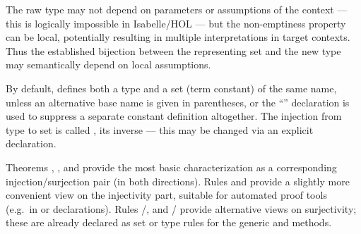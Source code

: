 \begin{isabellebody}
\begin{isamarkuptext}
\begin{description}
  The raw type may not depend on parameters or assumptions of the
  context --- this is logically impossible in Isabelle/HOL --- but the
  non-emptiness property can be local, potentially resulting in
  multiple interpretations in target contexts.  Thus the established
  bijection between the representing set  and the new type
   may semantically depend on local assumptions.

  By default, \hyperlink{command.HOL.typedef}{\mbox{}} defines both a type 
  and a set (term constant) of the same name, unless an alternative
  base name is given in parentheses, or the ``''
  declaration is used to suppress a separate constant definition
  altogether.  The injection from type to set is called ,
  its inverse  --- this may be changed via an explicit
  \hyperlink{keyword.HOL.morphisms}{\mbox{}} declaration.

  Theorems , , and  provide the most basic characterization as a
  corresponding injection/surjection pair (in both directions).  Rules
   and  provide a slightly
  more convenient view on the injectivity part, suitable for automated
  proof tools (e.g.\ in \hyperlink{attribute.simp}{\mbox{}} or \hyperlink{attribute.iff}{\mbox{}}
  declarations).  Rules /, and
  / provide alternative views
  on surjectivity; these are already declared as set or type rules for
  the generic \hyperlink{method.cases}{\mbox{}} and \hyperlink{method.induct}{\mbox{}} methods.


\end{description}
\end{isamarkuptext}
\end{isabellebody}
